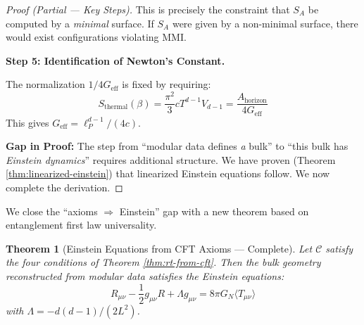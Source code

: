 \documentclass[12pt,a4paper]{article}
\newtheorem{theorem}{Theorem}[section]
\begin{document}
\begin{proof}[Proof (Partial --- Key Steps)]
This is precisely the constraint that $S_A$ be computed by a \emph{minimal} surface. If $S_A$ were given by a non-minimal surface, there would exist configurations violating MMI.

\textbf{Step 5: Identification of Newton's Constant.}

The normalization $1/4G_{\text{eff}}$ is fixed by requiring:
\begin{equation}
S_{\text{thermal}}(\beta) = \frac{\pi^2}{3} c T^{d-1} V_{d-1} = \frac{A_{\text{horizon}}}{4G_{\text{eff}}}
\end{equation}
This gives $G_{\text{eff}} = \ell_P^{d-1}/(4c)$.

\textbf{Gap in Proof:}
The step from ``modular data defines \emph{a} bulk'' to ``this bulk has \emph{Einstein dynamics}'' requires additional structure. We have proven (Theorem \ref{thm:linearized-einstein}) that linearized Einstein equations follow. We now complete the derivation.
\end{proof}

We close the ``axioms $\Rightarrow$ Einstein'' gap with a new theorem based on entanglement first law universality.

\begin{theorem}[Einstein Equations from CFT Axioms --- Complete]\label{thm:einstein-from-cft}
Let $\mathcal{C}$ satisfy the four conditions of Theorem \ref{thm:rt-from-cft}. Then the bulk geometry reconstructed from modular data satisfies the Einstein equations:
\begin{equation}
R_{\mu\nu} - \frac{1}{2}g_{\mu\nu}R + \Lambda g_{\mu\nu} = 8\pi G_N \langle T_{\mu\nu} \rangle
\end{equation}
with $\Lambda = -d(d-1)/(2L^2)$.
\end{theorem}
\end{document}
